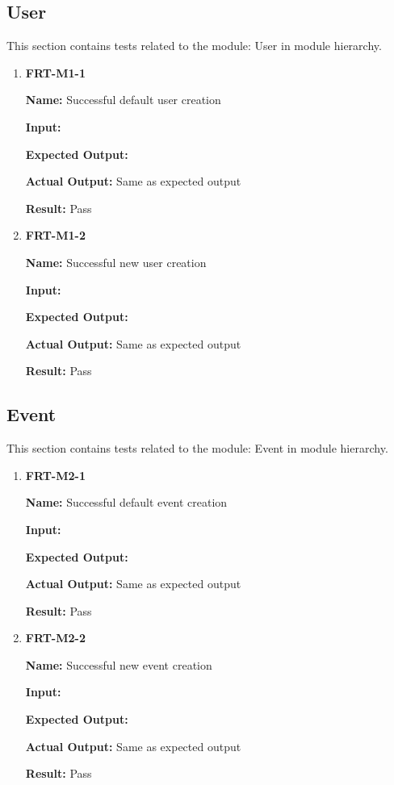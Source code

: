 \documentclass[12pt, titlepage]{article}
\begin{document}
\subsection{User}
This section contains tests related to the module: User in module hierarchy.
\begin{enumerate}
\item \textbf{FRT-M1-1}

\textbf{Name:} Successful default user creation

\textbf{Input:} 

\textbf{Expected Output:} 

\textbf{Actual Output:} Same as expected output

\textbf{Result:} Pass

\item \textbf{FRT-M1-2}

\textbf{Name:} Successful new user creation

\textbf{Input:} 

\textbf{Expected Output:} 

\textbf{Actual Output:} Same as expected output

\textbf{Result:} Pass
\end{enumerate}

\subsection{Event}
This section contains tests related to the module: Event in module hierarchy.
\begin{enumerate}
\item \textbf{FRT-M2-1}

\textbf{Name:} Successful default event creation

\textbf{Input:} 

\textbf{Expected Output:} 

\textbf{Actual Output:} Same as expected output

\textbf{Result:} Pass

\item \textbf{FRT-M2-2}

\textbf{Name:} Successful new event creation

\textbf{Input:} 

\textbf{Expected Output:} 

\textbf{Actual Output:} Same as expected output

\textbf{Result:} Pass
\end{enumerate}
\end{document}
